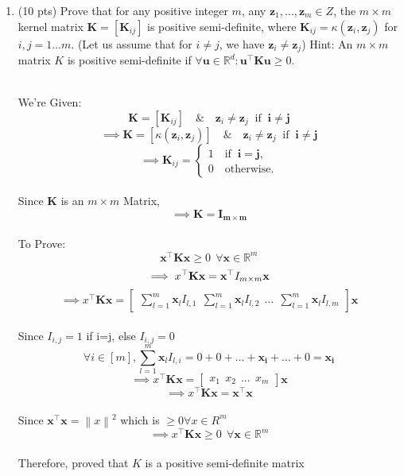\documentclass[a4paper]{article}
\theoremstyle{definition}
\def\R{\mathbb R}
\newenvironment{soln}{
    \leavevmode\color{blue}\ignorespaces
}{}
\begin{document}
\begin{enumerate}
    \item (10 pts) Prove that for any positive integer $m$, any $\mathbf z_1, \ldots,\mathbf z_m \in Z$, the $m\times m$ kernel matrix $\mathbf K = [\mathbf K_{ij} ]$ is
positive semi-definite, where $\mathbf K_{ij} = \kappa(\mathbf z_i
, \mathbf z_j )$ for $i, j = 1 \ldots m$. (Let us assume that for $i \neq j$, we have
$\mathbf z_i \neq \mathbf z_j$) Hint: An  $m\times m$  matrix $K $ is positive semi-definite if  $\forall \mathbf u\in \R^d: \mathbf u^\top \mathbf K\mathbf u\geq 0$.
\begin{soln}
    \\We're Given: 
    \[ \mathbf K = [ \mathbf K_{ij} ] \quad \& \quad  \mathbf z_i \neq \mathbf z_j \;\;\mathrm{ if }\;\; \mathbf i \neq \mathbf j \]
    \[ \implies \mathbf K = [ \kappa(\mathbf z_i,\mathbf z_j)  ] \quad \& \quad  \mathbf z_i \neq \mathbf z_j \;\;\mathrm{ if }\;\; \mathbf i \neq \mathbf j \]
    \[ \implies \mathbf K_{ij}=\begin{cases}
                1 \quad \mathrm{if }\;\; \mathbf i=\mathbf j,\\
                0\quad \mathrm{otherwise}.\end{cases} 
    \]
    \\ Since $\mathbf K$ is an $m \times m$ Matrix,
    \[ \implies \mathbf K = \mathbf{I_{m \times m}} \]
    \\ To Prove:
    \[ \mathbf x^\top \mathbf K\mathbf x\geq 0 \:\: \forall \mathbf x\in \R^m \]
    \[ \implies x^\top \mathbf K\mathbf x = \mathbf x^\top \mathbf \mathbf{I_{m \times m}}\mathbf x \]
    \[ \implies x^\top \mathbf K\mathbf x = \begin{bmatrix} \sum_{l=1}^{m} \mathbf x_l I_{l, 1} \:\: \sum_{l=1}^{m} \mathbf x_l I_{l, 2} \:\: \dots \:\: \sum_{l=1}^{m} \mathbf x_l I_{l, m} \end{bmatrix} \mathbf x \]
    \\ Since $I_{i, j} = 1$ if i=j, else $I_{i, j} = 0$
    \[ \forall i \in [m], \sum_{l=1}^{m}\mathbf{x}_l I_{l, i} =  0 + 0 + \dots + \mathbf{x_i} + \dots + 0 = \mathbf{x_i} \]
    \[ \implies x^\top \mathbf K\mathbf x = \begin{bmatrix} x_1 \:\: x_2 \:\: \dots \:\: x_m \end{bmatrix} \mathbf x \]
    \[ \implies x^\top \mathbf K\mathbf x = \mathbf x^\top \mathbf x \]
    \\Since $\mathbf x^\top \mathbf x = \left \| x \right \|^{2} $ which is $ \geq 0 \forall x \in R^m $
    \[ \implies x^\top \mathbf K\mathbf x \geq 0\:\: \forall \mathbf x\in \R^m \]
    \\ Therefore, proved that $K$ is a positive semi-definite matrix


\end{soln}
\end{enumerate}
\end{document}
